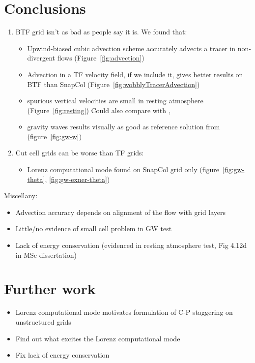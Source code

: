 \documentclass[a4paper]{article}
\begin{document}
\section{Conclusions}
\begin{enumerate}
	\item BTF grid isn't as bad as people say it is.  We found that:
	\begin{itemize}
		\item Upwind-biased cubic advection scheme accurately advects a tracer in non-divergent flows (Figure~\ref{fig:advection})
		\item Advection in a TF velocity field, if we include it, gives better results on BTF than SnapCol (Figure~\ref{fig:wobblyTracerAdvection})
		\item spurious vertical velocities are small in resting atmosphere (Figure~\ref{fig:resting})  Could also compare with \textcite{zaengl2012}, \textcite{good2014}
		\item gravity waves results visually as good as reference solution from \textcite{melvin2010} (figure~\ref{fig:gw-w})
	\end{itemize}

	\item Cut cell grids can be worse than TF grids:
	\begin{itemize}
		\item Lorenz computational mode found on SnapCol grid only (figure~\ref{fig:gw-theta}, \ref{fig:gw-exner-theta})
	\end{itemize}
\end{enumerate}

Miscellany:
\begin{itemize}
	\item Advection accuracy depends on alignment of the flow with grid layers
	\item Little/no evidence of small cell problem in GW test
	\item Lack of energy conservation (evidenced in resting atmosphere test, Fig 4.12d in MSc dissertation)
\end{itemize}

\section{Further work}
\begin{itemize}
	\item Lorenz computational mode motivates formulation of C-P staggering on unstructured grids
	\item Find out what excites the Lorenz computational mode
	\item Fix lack of energy conservation
\end{itemize}
\end{document}
